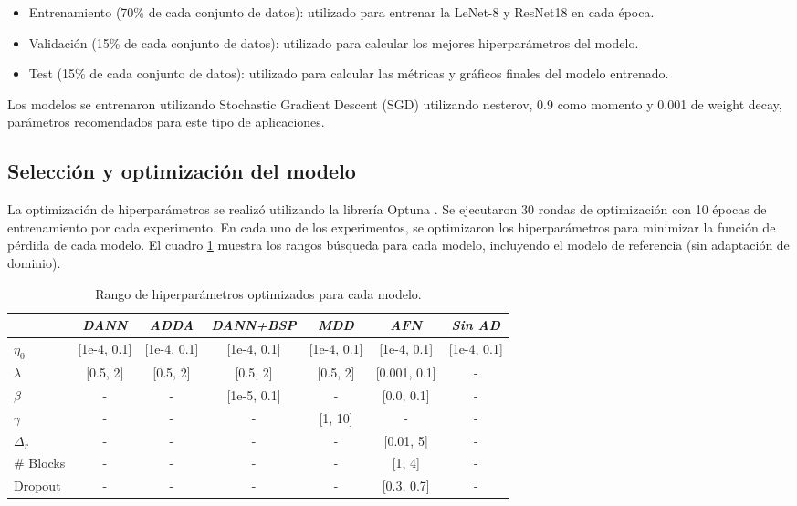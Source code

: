 \begin{itemize}
    \item Entrenamiento (70\% de cada conjunto de datos): utilizado para entrenar la LeNet-8 y ResNet18 en cada época.
    \item Validación (15\% de cada conjunto de datos): utilizado para calcular los mejores hiperparámetros del modelo.
    \item Test (15\% de cada conjunto de datos): utilizado para calcular las métricas y gráficos finales del modelo entrenado.
\end{itemize}

Los modelos se entrenaron utilizando Stochastic Gradient Descent (SGD) \parencite{sutskever2013importance} utilizando nesterov, 0.9 como momento y 0.001 de weight decay, parámetros recomendados
para este tipo de aplicaciones.

\subsection{Selección y optimización del modelo}

La optimización de hiperparámetros se realizó utilizando la librería Optuna \parencite{optuna_2019}. Se ejecutaron 30 rondas de optimización con 10 épocas de entrenamiento por cada experimento. En
cada uno de los experimentos, se optimizaron los hiperparámetros para minimizar la función de pérdida de cada modelo.
El cuadro \ref{tab:rangos-hiperparametros} muestra los rangos búsqueda para cada modelo, incluyendo el modelo de
referencia (sin adaptación de dominio).

\begin{table}[H]
    \centering
    \begin{tabular}{l|cccccc}
        \toprule
                   & {\it DANN}  & {\it ADDA}  & {\it DANN+BSP} & {\it MDD}   & {\it AFN}    & {\it Sin AD} \\
        \midrule
        $\eta_0$   & [1e-4, 0.1] & [1e-4, 0.1] & [1e-4, 0.1]    & [1e-4, 0.1] & [1e-4, 0.1]  & [1e-4, 0.1]  \\
        $\lambda$  & [0.5, 2]    & [0.5, 2]    & [0.5, 2]       & [0.5, 2]    & [0.001, 0.1] & -            \\
        $\beta$    & -           & -           & [1e-5, 0.1]    & -           & [0.0, 0.1]   & -            \\
        $\gamma$   & -           & -           & -              & [1, 10]     & -            & -            \\
        $\Delta_r$ & -           & -           & -              & -           & [0.01, 5]    & -            \\
        \# Blocks  & -           & -           & -              & -           & [1, 4]       & -            \\
        Dropout    & -           & -           & -              & -           & [0.3, 0.7]   & -            \\
        \bottomrule
    \end{tabular}
    \caption[Rango de hiperparámetros optimizados]{Rango de hiperparámetros optimizados para cada modelo.}
    \label{tab:rangos-hiperparametros}
\end{table}

